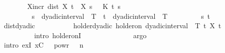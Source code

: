 \begin{isabellebody}
\ \ \ \ \ \ \isamarkupfalse%
\ X{\isacharunderscore}{\kern0pt}incr{\isacharcolon}{\kern0pt}\ {\isachardoublequoteopen}dist\ {\isacharparenleft}{\kern0pt}X\ t\ {\isasymomega}{\isacharparenright}{\kern0pt}\ {\isacharparenleft}{\kern0pt}X\ s\ {\isasymomega}{\isacharparenright}{\kern0pt}\ {\isasymle}\ {\isacharquery}{\kern0pt}K\ t\ s{\isachardoublequoteclose}\isanewline
\ \ \ \ \ \ \ \ \ {\isachardoublequoteopen}s\ {\isasymin}\ dyadic{\isacharunderscore}{\kern0pt}interval\ {}\ T{\isachardoublequoteclose}\ \ {\isachardoublequoteopen}t\ {\isasymin}\ {\isacharparenleft}{\kern0pt}dyadic{\isacharunderscore}{\kern0pt}interval\ {}\ T{\isacharparenright}{\kern0pt}{\isachardoublequoteclose}\isanewline
\ \ \ \ \ \ \ \ \ s\ t\isanewline
\ \ \ \ \ \ \ \ \isamarkupfalse%
\ dist{\isacharunderscore}{\kern0pt}dyadic\ \isamarkupfalse%
\isanewline
\ \ \ \ \ \ \isamarkupfalse%
\ \isamarkupfalse%
\ holder{\isacharunderscore}{\kern0pt}dyadic{\isacharcolon}{\kern0pt}\ {\isachardoublequoteopen}{\isasymgamma}{\isacharminus}{\kern0pt}holder{\isacharunderscore}{\kern0pt}on\ {\isacharparenleft}{\kern0pt}dyadic{\isacharunderscore}{\kern0pt}interval\ {}\ T{\isacharparenright}{\kern0pt}\ {\isacharparenleft}{\kern0pt}{\isasymlambda}t{\isachardot}{\kern0pt}\ X\ t\ {\isasymomega}{\isacharparenright}{\kern0pt}{\isachardoublequoteclose}\isanewline
\ \ \ \ \ \ \ \ \isamarkupfalse%
\ {\isacharparenleft}{\kern0pt}intro\ holder{\isacharunderscore}{\kern0pt}onI{\isacharparenright}{\kern0pt}\isanewline
\ \ \ \ \ \ \ \ \isamarkupfalse%
\ {\isacartoucheopen}{\isasymgamma}\ {\isasymin}\ {\isacharbraceleft}{\kern0pt}{}{\isacharless}{\kern0pt}{\isachardot}{\kern0pt}{\isachardot}{\kern0pt}{}{\isacharbraceright}{\kern0pt}{\isacartoucheclose}\ \isamarkupfalse%
\ argo\isanewline
\ \ \ \ \ \ \ \ \isamarkupfalse%
\ {\isacharparenleft}{\kern0pt}intro\ exI{\isacharbrackleft}{\kern0pt}\ x{\isacharequal}{\kern0pt}{\isachardoublequoteopen}{\isacharquery}{\kern0pt}C\ {\isacharasterisk}{\kern0pt}\ {}\ powr\ {\isacharparenleft}{\kern0pt}{\isacharparenleft}{\kern0pt}{}{\isacharminus}{\kern0pt}{\isasymgamma}{\isacharparenright}{\kern0pt}\ {\isacharasterisk}{\kern0pt}\ n\isanewline

\end{isabellebody}
